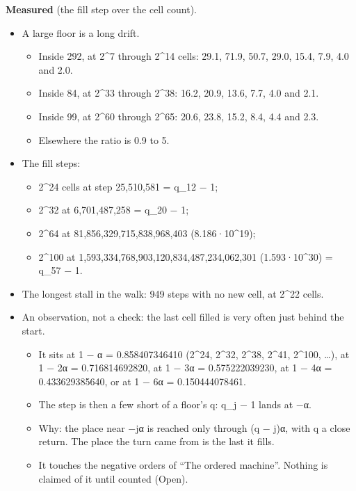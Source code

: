 \textbf{Measured} (the fill step over the cell count).

\begin{itemize}
\item A large floor is a long drift.

\begin{itemize}
\item Inside 292, at 2\textasciicircum{}7 through 2\textasciicircum{}14 cells: 29.1, 71.9, 50.7, 29.0, 15.4, 7.9, 4.0 and 2.0.
\item Inside 84, at 2\textasciicircum{}33 through 2\textasciicircum{}38: 16.2, 20.9, 13.6, 7.7, 4.0 and 2.1.
\item Inside 99, at 2\textasciicircum{}60 through 2\textasciicircum{}65: 20.6, 23.8, 15.2, 8.4, 4.4 and 2.3.
\item Elsewhere the ratio is 0.9 to 5.
\end{itemize}
\item The fill steps:

\begin{itemize}
\item 2\textasciicircum{}24 cells at step 25,510,581 = q\_\allowbreak{}12 − 1;
\item 2\textasciicircum{}32 at 6,701,487,258 = q\_\allowbreak{}20 − 1;
\item 2\textasciicircum{}64 at 81,856,329,715,838,968,403 (8.186·10\textasciicircum{}19);
\item 2\textasciicircum{}100 at 1,593,334,768,903,120,834,487,234,062,301 (1.593·10\textasciicircum{}30) = q\_\allowbreak{}57 − 1.
\end{itemize}
\item The longest stall in the walk: 949 steps with no new cell, at 2\textasciicircum{}22 cells.
\item An observation, not a check: the last cell filled is very often just behind the start.

\begin{itemize}
\item It sits at 1 − α = 0.858407346410 (2\textasciicircum{}24, 2\textasciicircum{}32, 2\textasciicircum{}38, 2\textasciicircum{}41, 2\textasciicircum{}100, …), at 1 − 2α = 0.716814692820, at 1 − 3α = 0.575222039230, at 1 − 4α = 0.433629385640, or at 1 − 6α = 0.150444078461.
\item The step is then a few short of a floor's q: q\_\allowbreak{}j − 1 lands at −α.
\item Why: the place near −jα is reached only through (q − j)α, with q a close return. The place the turn came from is the last it fills.
\item It touches the negative orders of “The ordered machine”. Nothing is claimed of it until counted (Open).
\end{itemize}
\end{itemize}

